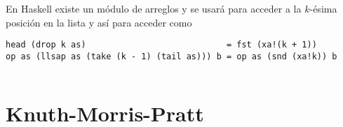 
En Haskell existe un módulo de arreglos %
y se usará para acceder a la $k$-ésima posición en la lista
y así para acceder como

\begin{verbatim}
head (drop k as)                            = fst (xa!(k + 1))
op as (llsap as (take (k - 1) (tail as))) b = op as (snd (xa!k)) b
\end{verbatim}


\inputminted{haskell}{codigo/haskell/FailureFunctionOptimized.hs}


\section{Knuth-Morris-Pratt}